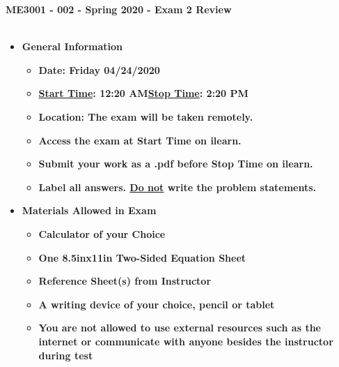 \documentclass[11pt]{article}
\begin{document}
\textbf{ \LARGE ME3001 - 002 - Spring 2020 - Exam 2 Review  } \\\\

\large
\begin{itemize}
	\item  \textbf{\Large General Information}\\

	\begin{itemize}

		\item  \textbf{Date: Friday 04/24/2020 }\\
		\item  \textbf{\underline{Start Time}: 12:20 AM\hspace{5mm}\underline{Stop Time}: 2:20 PM}\\
		\item  \textbf{Location: The exam will be taken remotely. }\\
		\item  \textbf{Access the exam at Start Time on ilearn.} \\
		\item  \textbf{Submit your work as a .pdf before Stop Time on ilearn.}\\ 
		\item  \textbf{Label all answers. \underline{Do not} write the problem statements.}\\
	\end{itemize}

		\item  \textbf{\Large Materials Allowed in Exam}\\

	\begin{itemize}

		\item  \textbf{Calculator of your Choice}\\
		\item  \textbf{One 8.5inx11in Two-Sided Equation Sheet }\\
		\item  \textbf{Reference Sheet(s) from Instructor}\\
		\item  \textbf{A writing device of your choice, pencil or tablet}\\
		\item  \textbf{You are not allowed to use external resources such as the \\internet or communicate with anyone besides the instructor during test}\\


\end{itemize}
\end{itemize}
\end{document}
